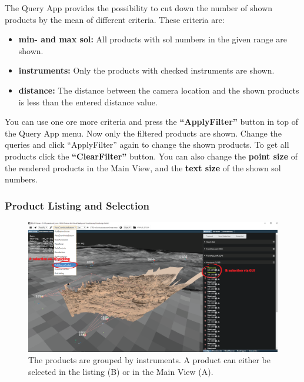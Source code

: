The Query App provides the possibility to cut down the number of shown products by the mean of different criteria. These criteria are:
\begin{itemize}
	\item \textbf{min- and max sol:} All products with sol numbers in the given range are shown.
	\item \textbf{instruments:} Only the products with checked instruments are shown.
	\item \textbf{distance:} The distance between the camera location and the shown products is less than the entered distance value.
\end{itemize}
You can use one ore more criteria and press the \textbf{``ApplyFilter''} button in top of the Query App menu. Now only the filtered products are shown. Change the queries and click ``ApplyFilter'' again to change the shown products. To get all products click the \textbf{``ClearFilter''} button. 
You can also change the \textbf{point size} of the rendered products in the Main View, and the \textbf{text size} of the shown sol numbers.

\subsubsection{Product Listing and Selection}
\label{sec:selection}

\begin{figure}[h]
				\centering
					\includegraphics[width=1\textwidth]{pics/ListingAI.png}
				\caption[Product Listing]{The products are grouped by instruments. A product can either be selected in the listing (B) or in the Main View (A). }
				\label{fig:ProductListing}
		 \end{figure}
		
